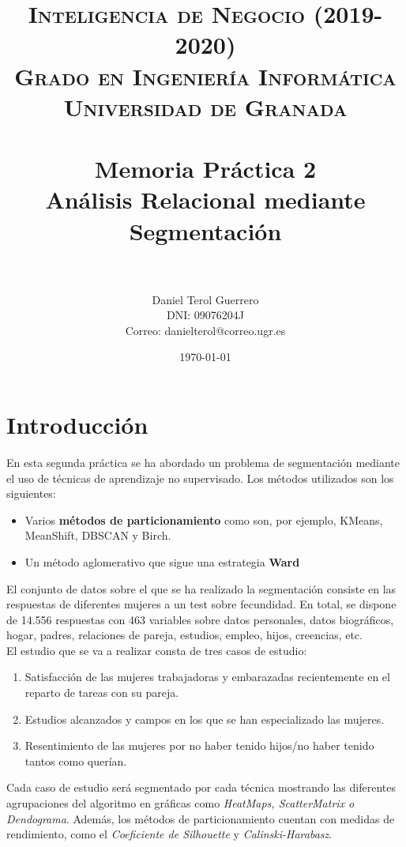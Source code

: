 \documentclass[paper=a4, fontsize=12pt]{article} %
\title{ 
\normalfont \normalsize 
\textsc{{\bf Inteligencia de Negocio (2019-2020)} \\ Grado en Ingeniería Informática \\ Universidad de Granada} \\ [25pt] %
\horrule{0.5pt} \\[0.4cm] %
\huge Memoria Práctica 2 \\ Análisis Relacional mediante Segmentación\\%
\horrule{2pt} \\[0.5cm] %
}
\author{Daniel Terol Guerrero\\DNI: 09076204J\\Correo: danielterol@correo.ugr.es} %
\date{\normalsize\today} %
\numberwithin{equation}{section} %
\numberwithin{figure}{section} %
\numberwithin{table}{section} %
\begin{document}
\maketitle %
\newpage %

\tableofcontents %
\newpage
{}

\section{Introducción}
\large En esta segunda práctica se ha abordado un problema de segmentación mediante el uso de técnicas de aprendizaje no supervisado. Los métodos utilizados son los siguientes: 

\begin{itemize}
\item Varios \textbf{métodos de particionamiento} como son, por ejemplo, KMeans, MeanShift, DBSCAN y Birch.
\item Un método  aglomerativo que sigue una estrategia \textbf{Ward}
\end{itemize}

El conjunto de datos sobre el que se ha realizado la segmentación consiste en las respuestas de diferentes mujeres a un test sobre fecundidad. En total, se dispone de 14.556 respuestas con 463 variables sobre datos personales, datos biográficos, hogar, padres, relaciones de pareja, estudios, empleo, hijos, creencias, etc. \\

El estudio que se va a realizar consta de tres casos de estudio:
\begin{enumerate}
\item Satisfacción de las mujeres trabajadoras y embarazadas recientemente en el reparto de tareas con su pareja.
\item Estudios alcanzados y campos en los que se han especializado las mujeres.
\item Resentimiento de las mujeres por no haber tenido hijos/no haber tenido tantos como querían.
\end{enumerate}

Cada caso de estudio será segmentado por cada técnica mostrando las diferentes agrupaciones del algoritmo en gráficas como \textit{HeatMaps, ScatterMatrix o Dendograma}. Además, los métodos de particionamiento cuentan con medidas de rendimiento, como el \textit{Coeficiente de Silhouette} y \textit{Calinski-Harabasz}. \\
\end{document}
